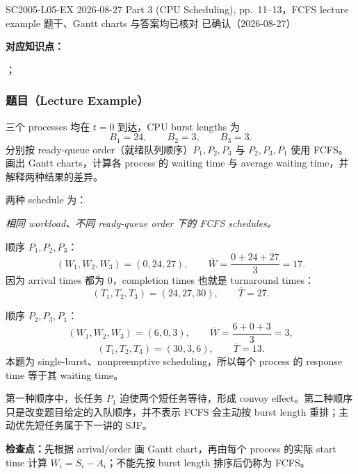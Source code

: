 

\examplemeta
  {SC2005-L05-EX}
  {2026-08-27}
  {Part 3 (CPU Scheduling), pp.~11--13，FCFS lecture example}
  {题干、Gantt charts 与答案均已核对}
  {已确认（2026-08-27）}


\textbf{对应知识点：}\par
{}；

\subsubsection*{题目（Lecture Example）}

三个 processes 均在 $t=0$ 到达，CPU burst lengths 为
\[
  B_1=24,\qquad B_2=3,\qquad B_3=3.
\]
分别按 ready-queue order（就绪队列顺序）$P_1,P_2,P_3$ 与 $P_2,P_3,P_1$ 使用 FCFS。画出 Gantt charts，计算各 process 的 waiting time 与 average waiting time，并解释两种结果的差异。

\begin{checkedsolution}
两种 schedule 为：
\begin{center}
  \centering
  \resizebox{0.96\textwidth}{!}{}

  \smallskip
  \textit{相同 workload、不同 ready-queue order 下的 FCFS schedules。}
\end{center}

顺序 $P_1,P_2,P_3$：
\[
  (W_1,W_2,W_3)=(0,24,27),\qquad
  \overline W=\frac{0+24+27}{3}=17.
\]
因为 arrival times 都为 $0$，completion times 也就是 turnaround times：
\[
  (T_1,T_2,T_3)=(24,27,30),\qquad \overline T=27.
\]

顺序 $P_2,P_3,P_1$：
\[
  (W_1,W_2,W_3)=(6,0,3),\qquad
  \overline W=\frac{6+0+3}{3}=3,
\]
\[
  (T_1,T_2,T_3)=(30,3,6),\qquad \overline T=13.
\]
本题为 single-burst、nonpreemptive scheduling，所以每个 process 的 response time 等于其 waiting time。

第一种顺序中，长任务 $P_1$ 迫使两个短任务等待，形成 convoy effect。第二种顺序只是改变题目给定的入队顺序，并不表示 FCFS 会主动按 burst length 重排；主动优先短任务属于下一讲的 SJF。
\end{checkedsolution}

\textbf{检查点：}先根据 arrival/order 画 Gantt chart，再由每个 process 的实际 start time 计算 $W_i=S_i-A_i$；不能先按 burst length 排序后仍称为 FCFS。
